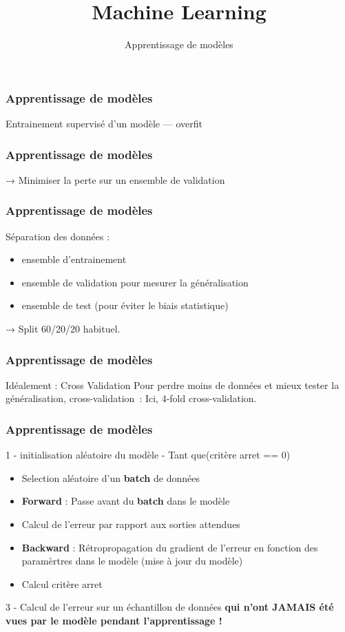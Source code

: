 \documentclass{formation}
\title{Machine Learning}
\subtitle{Apprentissage de modèles}
\begin{document}
\maketitle

\begin{frame}
  \frametitle{Apprentissage de modèles}
  Entrainement supervisé d'un modèle — overfit
\end{frame}

\begin{frame}
  \frametitle{Apprentissage de modèles}
  → Minimiser la perte sur un ensemble de validation
\end{frame}

\begin{frame}
  \frametitle{Apprentissage de modèles}
  Séparation des données :
  \begin{itemize}
  \item ensemble d'entrainement
  \item ensemble de validation pour mesurer la généralisation
  \item ensemble de test (pour éviter le biais statistique)
  \end{itemize}
  → Split 60/20/20 habituel.
\end{frame}

\begin{frame}
  \frametitle{Apprentissage de modèles}
  Idéalement : Cross Validation
  Pour \og perdre\fg{} moins de données et mieux tester la
  généralisation, cross-validation :
  Ici, 4-fold cross-validation.
\end{frame}

\begin{frame}
  \frametitle{Apprentissage de modèles}
  1 - initialisation aléatoire du modèle
   - Tant que(critère arret == 0)
  \begin{itemize}
  \item Selection aléatoire d'un \textbf{batch} de données
  \item \textbf{Forward} : Passe avant du \textbf{batch} dans le modèle
  \item Calcul de l'erreur par rapport aux sorties attendues
  \item \textbf{Backward} : Rétropropagation du gradient de l'erreur en fonction des paramèrtres dans le modèle (mise à jour du modèle)
  \item Calcul critère arret
  \end{itemize}
  3 - Calcul de l'erreur sur un échantillon de données  \textbf{qui n'ont JAMAIS été vues par le modèle pendant l'apprentissage !}
\end{frame}
\end{document}
